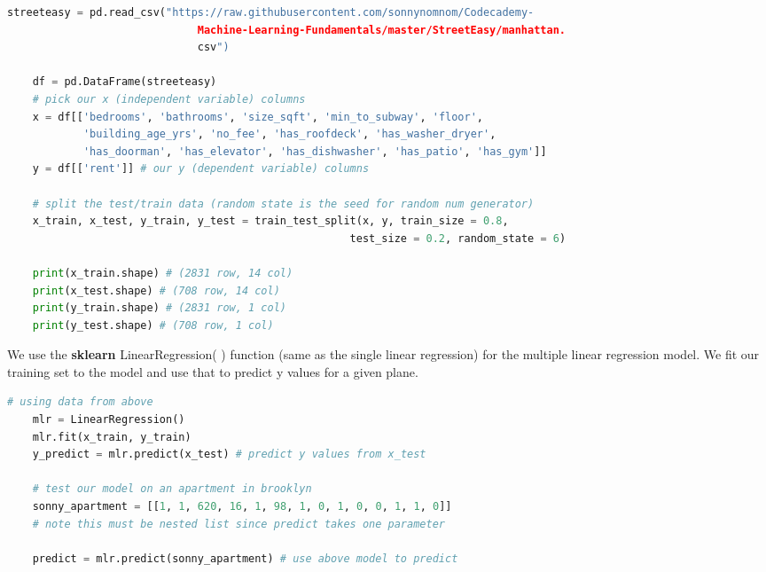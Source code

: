 \documentclass[11pt, a4paper]{article}
\begin{document}
\begin{spacing}{1.1}
\begin{lstlisting}[language=Python]
	streeteasy = pd.read_csv("https://raw.githubusercontent.com/sonnynomnom/Codecademy-
	                          Machine-Learning-Fundamentals/master/StreetEasy/manhattan.
	                          csv")
	
	df = pd.DataFrame(streeteasy)
	# pick our x (independent variable) columns
	x = df[['bedrooms', 'bathrooms', 'size_sqft', 'min_to_subway', 'floor', 
	        'building_age_yrs', 'no_fee', 'has_roofdeck', 'has_washer_dryer', 
	        'has_doorman', 'has_elevator', 'has_dishwasher', 'has_patio', 'has_gym']]
	y = df[['rent']] # our y (dependent variable) columns
	
	# split the test/train data (random state is the seed for random num generator)
	x_train, x_test, y_train, y_test = train_test_split(x, y, train_size = 0.8, 
	                                                  test_size = 0.2, random_state = 6)
	
	print(x_train.shape) # (2831 row, 14 col)
	print(x_test.shape) # (708 row, 14 col)
	print(y_train.shape) # (2831 row, 1 col)
	print(y_test.shape) # (708 row, 1 col)	\end{lstlisting}\vspace*{1mm}
	We use the \textbf{sklearn} LinearRegression( ) function (same as the single linear regression) for the multiple linear regression model. We fit our training set to the model and use that to predict y values for a given plane. 
	\begin{lstlisting}[language=Python]
	# using data from above
	mlr = LinearRegression()
	mlr.fit(x_train, y_train)
	y_predict = mlr.predict(x_test) # predict y values from x_test
	
	# test our model on an apartment in brooklyn
	sonny_apartment = [[1, 1, 620, 16, 1, 98, 1, 0, 1, 0, 0, 1, 1, 0]]
	# note this must be nested list since predict takes one parameter
	
	predict = mlr.predict(sonny_apartment) # use above model to predict
	

\end{lstlisting}
\end{spacing}
\end{document}
